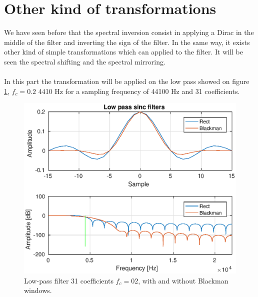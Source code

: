 \documentclass[twoside,twocolumn]{article}
\begin{document}
\section{Other kind of transformations}
We have seen before that the spectral inversion consist in applying a Dirac in the middle of the filter and inverting the sign of the filter. In the same way, it exists other kind of simple transformations which can applied to the filter. It will be seen  the spectral shifting and the spectral mirroring.\\ \\
 In this part the transformation will be applied on the low pass showed on figure \ref{lowpass}, $f_c=0.2$ 4410 Hz for a sampling frequency of 44100 Hz and 31 coefficients. 
 \begin{figure}[h!]
 	\centering
 	\includegraphics[scale=0.5]{./images/basetrans.eps}
 	\caption{Low-pass filter 31 coefficients $f_{c}=02$, with and without Blackman windows.}
 	\label{lowpass}
 \end{figure}
  
\end{document}
